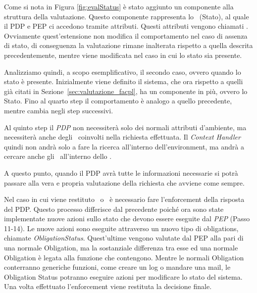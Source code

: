 Come si nota in Figura \ref{fig:evalStatus} è stato aggiunto un componente alla struttura della valutazione.
Questo componente rappresenta lo \status \ (Stato), al quale il \ac{PDP} e \ac{PEP} ci accedono tramite attributi.
Questi attributi vengono chiamati \statusattribute. Ovviamente quest'estensione non modifica il comportamento nel caso di assenza di stato, di conseguenza la valutazione rimane inalterata rispetto a quella descrita precedentemente, mentre viene modificata nel caso in cui lo stato sia presente.\\ \par
Analizziamo quindi, a scopo esemplificativo, il secondo caso, ovvero quando lo stato è presente. Inizialmente viene definito il sistema, che ora rispetto a quelli già citati in Sezione~\ref{sec:valutazione_facpl}, ha un componente in più, ovvero lo Stato.
Fino al quarto step il comportamento è analogo a quello precedente, mentre cambia negli step successivi.\\ \par
Al quinto step il \textit{PDP} non necessiterà solo dei normali attributi d'ambiente, ma necessiterà anche degli \statusattribute \ coinvolti nella richiesta effettuata. Il \textit{Context Handler} quindi non andrà solo a fare la ricerca all'interno dell'environment, ma andrà a cercare anche gli \statusattribute \ all'interno dello \status.\\ \par
A questo punto, quando il PDP avrà tutte le informazioni necessarie si potrà passare alla vera e propria valutazione della richiesta che avviene come sempre.\\ \par
Nel caso in cui viene restituto \permit \ o \deny \ è necessario fare l'enforcement della risposta del PDP. Questo processo differisce dal precedente poiché ora sono state implementate nuove azioni sullo stato che devono essere eseguite dal \textit{PEP} (Passo 11-14). Le nuove azioni sono eseguite attraverso un nuovo tipo di obligations, chiamate \textit{ObligationStatus}. 
Quest'ultime vengono valutate dal \ac{PEP} alla pari di una normale Obligation, ma la sostanziale differenza tra esse ed una normale Obligation è legata alla funzione che contengono. Mentre le normali Obligation conterranno generiche funzioni, come creare un log o mandare una mail, le Obligation Status potranno eseguire azioni per modificare lo stato del sistema.
Una volta effettuato l'enforcement viene restituta la decisione finale.



